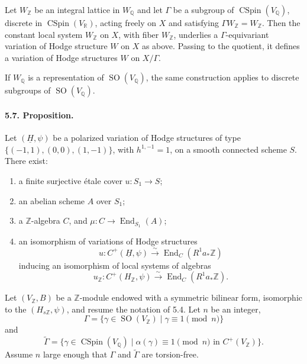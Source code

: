 \documentclass[10pt]{article}
\newcommand{\Q}{\mathbb{Q}}
\newcommand{\R}{\mathbb{R}}
\newcommand{\Z}{\mathbb{Z}}
\newcommand{\End}{\operatorname{End}}
\newcommand{\SO}{\operatorname{SO}}
\newcommand{\CSpin}{\operatorname{CSpin}}
\newcommand{\iso}{\xrightarrow{\sim}}
\begin{document}
Let $W_\Z$ be an integral lattice in $W_\Q$ and let $\Gamma$ be a subgroup of $\CSpin(V_\Q)$, discrete in $\CSpin(V_\R)$, acting freely on $X$ and satisfying $\Gamma W_\Z=W_\Z$. Then the constant local system $W_\Z$ on $X$, with fiber $W_\Z$, underlies a $\Gamma$-equivariant variation of Hodge structure $W$ on $X$ as above. Passing to the quotient, it defines a variation of Hodge structures $W$ on $X/\Gamma$.

If $W_\Q$ is a representation of $\SO(V_\Q)$, the same construction applies to discrete subgroups of $\SO(V_\Q)$.

\paragraph{5.7. Proposition.} Let $(\underline H,\psi)$ be a polarized variation of Hodge structures of type $\{(-1,1),(0,0),(1,-1)\}$, with $h^{1,-1}=1$, on a smooth connected scheme $S$. There exist:
\begin{enumerate}[label=\alph*)]
\item a finite surjective étale cover $u:S_1\to S$;
\item an abelian scheme $A$ over $S_1$;
\item a $\Z$-algebra $C$, and $\mu:C\to\End_{S_1}(A)$;
\item an isomorphism of variations of Hodge structures
\[
u:C^+(\underline H,\psi)\iso \End_C(R^1a_*\Z)
\]
inducing an isomorphism of local systems of algebras
\[
u_\Z:C^+(H_\Z,\psi)\iso \End_C(R^1a_*\Z).
\]
\end{enumerate}

Let $(V_\Z,B)$ be a $\Z$-module endowed with a symmetric bilinear form, isomorphic to the $(H_{s\Z},\psi)$, and resume the notation of 5.4. Let $n$ be an integer,
\[
\Gamma=\{\gamma\in\SO(V_\Z)\mid \gamma\equiv1\pmod n\}
\]
and
\[
\widetilde\Gamma=\{\gamma\in\CSpin(V_\Q)\mid \alpha(\gamma)\equiv1\pmod n
\text{ in }C^+(V_\Z)\}.
\]
Assume $n$ large enough that $\Gamma$ and $\widetilde\Gamma$ are torsion-free.
\end{document}
